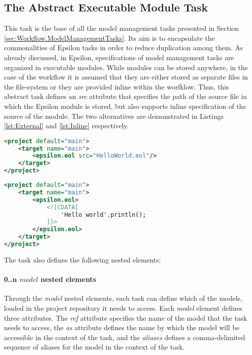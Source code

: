 \subsection{The Abstract Executable Module Task}
\label{sec:ExecutableModuleTask}

This task is the base of all the model management tasks presented in Section \ref{sec:Workflow.ModelManagementTasks}. Its aim is to encapsulate the commonalities of Epsilon tasks in order to reduce duplication among them. As already discussed, in Epsilon, specifications of model management tasks are organized in executable modules. While modules can be stored anywhere, in the case of the workflow it is assumed that they are either stored as separate files in the file-system or they are provided inline within the worfklow. Thus, this abstract task defines an \textit{src} attribute that specifies the path of the source file in which the Epsilon module is stored, but also supports inline specification of the source of the module. The two alternatives are demonstrated in Listings \ref{lst:External} and \ref{lst:Inline} respectively.

\begin{lstlisting}[basicstyle=\ttfamily\footnotesize, flexiblecolumns=true, numbers=none, nolol=true, caption=External Module Specification, label=lst:External, numbers=left, language=XML, tabsize=2]
<project default="main">
	<target name="main">
		<epsilon.eol src="HelloWorld.eol"/>
	</target>
</project>
\end{lstlisting}

\begin{lstlisting}[basicstyle=\ttfamily\footnotesize, flexiblecolumns=true, numbers=none, nolol=true, caption=Inline Module Specification, label=lst:Inline, numbers=left, language=XML, tabsize=2]
<project default="main">
	<target name="main">
		<epsilon.eol>
			<![CDATA[
				'Hello world'.println();
			]]>
		</epsilon.eol>
	</target>
</project>
\end{lstlisting}


The task also defines the following nested elements:

\paragraph{0..n $model$ nested elements}

Through the \emph{model} nested elements, each task can define which of the models, loaded in the project repository it needs to access. Each \emph{model} element defines three attributes. The \emph{ref} attribute specifies the name of the model that the task needs to access, the \emph{as} attribute defines the name by which the model will be accessible in the context of the task, and the \emph{aliases} defines a comma-delimited sequence of aliases for the model in the context of the task.

